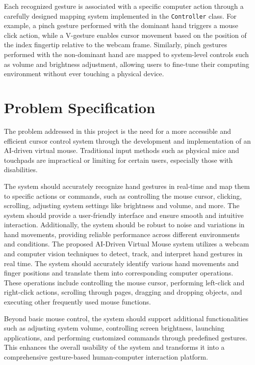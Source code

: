 \documentclass[12pt,a4paper]{report}
\begin{document}
Each recognized gesture is associated with a specific computer action through a
carefully designed mapping system implemented in the \texttt{Controller} class. For
example, a pinch gesture performed with the dominant hand triggers a mouse click action,
while a V-gesture enables cursor movement based on the position of the index fingertip
relative to the webcam frame. Similarly, pinch gestures performed with the non-dominant
hand are mapped to system-level controls such as volume and brightness adjustment,
allowing users to fine-tune their computing environment without ever touching a physical
device.

\section{Problem Specification}

The problem addressed in this project is the need for a more accessible and efficient cursor
control system through the development and implementation of an AI-driven virtual mouse.
Traditional input methods such as physical mice and touchpads are impractical or limiting for
certain users, especially those with disabilities.

The system should accurately recognize hand gestures in real-time and map them to specific
actions or commands, such as controlling the mouse cursor, clicking, scrolling, adjusting
system settings like brightness and volume, and more. The system should provide a
user-friendly interface and ensure smooth and intuitive interaction. Additionally, the system
should be robust to noise and variations in hand movements, providing reliable performance
across different environments and conditions.
The proposed AI-Driven Virtual Mouse system utilizes a webcam and computer vision techniques to detect, track, and interpret hand gestures in real time. The system should accurately identify various hand movements and finger positions and translate them into corresponding computer operations. These operations include controlling the mouse cursor, performing left-click and right-click actions, scrolling through pages, dragging and dropping objects, and executing other frequently used mouse functions.

Beyond basic mouse control, the system should support additional functionalities such as adjusting system volume, controlling screen brightness, launching applications, and performing customized commands through predefined gestures. This enhances the overall usability of the system and transforms it into a comprehensive gesture-based human-computer interaction platform.
\end{document}
